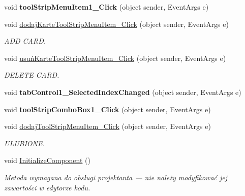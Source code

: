 \begin{DoxyCompactItemize}
void {\bfseries tool\+Strip\+Menu\+Item1\+\_\+\+Click} (object sender, Event\+Args e)
\item 
\mbox{\label{class_windows_forms_app2_1_1_przegladarka_a1a65fd7d680f3af4d036af3992129a81}} 
void \hyperlink{class_windows_forms_app2_1_1_przegladarka_a1a65fd7d680f3af4d036af3992129a81}{dodaj\+Karte\+Tool\+Strip\+Menu\+Item\+\_\+\+Click} (object sender, Event\+Args e)
\begin{DoxyCompactList}\small\item\em A\+DD C\+A\+RD. \end{DoxyCompactList}\item 
\mbox{\label{class_windows_forms_app2_1_1_przegladarka_ac405fedd591d91fba5dadc8d0b3b2419}} 
void \hyperlink{class_windows_forms_app2_1_1_przegladarka_ac405fedd591d91fba5dadc8d0b3b2419}{usuń\+Karte\+Tool\+Strip\+Menu\+Item\+\_\+\+Click} (object sender, Event\+Args e)
\begin{DoxyCompactList}\small\item\em D\+E\+L\+E\+TE C\+A\+RD. \end{DoxyCompactList}\item 
\mbox{\label{class_windows_forms_app2_1_1_przegladarka_a1b8caaa571e0f20423e36048bebe658d}} 
void {\bfseries tab\+Control1\+\_\+\+Selected\+Index\+Changed} (object sender, Event\+Args e)
\item 
\mbox{\label{class_windows_forms_app2_1_1_przegladarka_a7c9a987ad2c6d99e4b8744247939b447}} 
void {\bfseries tool\+Strip\+Combo\+Box1\+\_\+\+Click} (object sender, Event\+Args e)
\item 
\mbox{\label{class_windows_forms_app2_1_1_przegladarka_a44c5511659d6a003813e4efc5308a69c}} 
void \hyperlink{class_windows_forms_app2_1_1_przegladarka_a44c5511659d6a003813e4efc5308a69c}{dodaj\+Tool\+Strip\+Menu\+Item\+\_\+\+Click} (object sender, Event\+Args e)
\begin{DoxyCompactList}\small\item\em U\+L\+U\+B\+I\+O\+NE. \end{DoxyCompactList}\item 
void \hyperlink{class_windows_forms_app2_1_1_przegladarka_a16d94dcbfce3b5319ae8b36f0d9fe26b}{Initialize\+Component} ()
\begin{DoxyCompactList}\small\item\em Metoda wymagana do obsługi projektanta — nie należy modyfikować jej zawartości w edytorze kodu. \end{DoxyCompactList}\end{DoxyCompactItemize}
